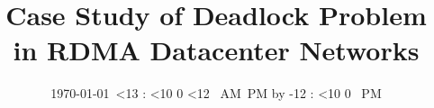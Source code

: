 \documentclass{sig-alternate-10pt}
\def\drafttime{\ifnum \hour<13 \number\hour:%
                      \ifnum \minute<10 0\fi
                      \number\minute
                      \ifnum \hour<12 \ AM\else \ PM\fi
         \else \advance \hour by -12 \number\hour:%
                      \ifnum \minute<10 0\fi
                      \number\minute \ PM\fi}
\def\timestamp{\today \ \drafttime}
\begin{document}

\title{Case Study of Deadlock Problem in RDMA Datacenter Networks}
\author{\timestamp}
\maketitle



%

%
%
%
%
%
%



\begin{small}


\end{small}
%
\end{document}
